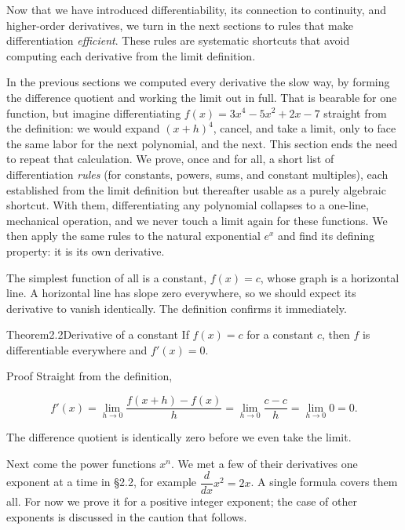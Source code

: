 \documentclass[a4paper,12pt,oneside]{memoir}
\begin{document}
Now that we have introduced differentiability, its connection to continuity, and higher-order derivatives, we turn in the next sections to rules that make differentiation \emph{efficient}. These rules are systematic shortcuts that avoid computing each derivative from the limit definition.


In the previous sections we computed every derivative the slow way, by forming the difference quotient and working the limit out in full. That is bearable for one function, but imagine differentiating \(f(x) = 3x^{4} - 5x^{2} + 2x - 7\) straight from the definition: we would expand \((x + h)^{4}\), cancel, and take a limit, only to face the same labor for the next polynomial, and the next. This section ends the need to repeat that calculation. We prove, once and for all, a short list of differentiation \emph{rules} (for constants, powers, sums, and constant multiples), each established from the limit definition but thereafter usable as a purely algebraic shortcut. With them, differentiating any polynomial collapses to a one-line, mechanical operation, and we never touch a limit again for these functions. We then apply the same rules to the natural exponential \(e^{x}\) and find its defining property: it is its own derivative.

The simplest function of all is a constant, \(f(x) = c\), whose graph is a horizontal line. A horizontal line has slope zero everywhere, so we should expect its derivative to vanish identically. The definition confirms it immediately.

\begin{envtheorem}{Theorem}{2.2}{Derivative of a constant}
If \(f(x) = c\) for a constant \(c\), then \(f\) is differentiable everywhere and \(f'(x) = 0\).
\end{envtheorem}
\begin{envproof}{Proof}{}{}
Straight from the definition,

\[ f'(x) = \lim_{h \to 0} \frac{f(x + h) - f(x)}{h} = \lim_{h \to 0} \frac{c - c}{h} = \lim_{h \to 0} 0 = 0. \]

The difference quotient is identically zero before we even take the limit.
\end{envproof}
Next come the power functions \(x^{n}\). We met a few of their derivatives one exponent at a time in §2.2, for example \(\dfrac{d}{dx}x^{2} = 2x\). A single formula covers them all. For now we prove it for a positive integer exponent; the case of other exponents is discussed in the caution that follows.
\end{document}
